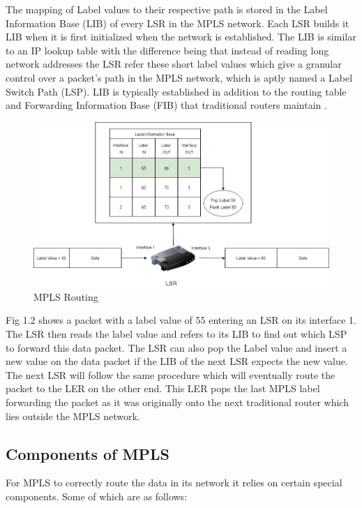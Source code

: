 The mapping of Label values to their respective path is stored in the Label Information Base (LIB) of every LSR in the MPLS network. Each LSR builds it LIB when it is first initialized when the network is established. The LIB is similar to an IP lookup table with the difference being that instead of reading long network addresses the LSR refer these short label values which give a granular control over a packet's path in the MPLS network, which is aptly named a Label Switch Path (LSP). LIB is typically established in addition to the routing table and Forwarding Information Base (FIB) that traditional routers maintain \cite{pise2005packet}.

\begin{figure}[H]
       \centering\includegraphics[width=\textwidth]{images/2_MPLSRouting.jpg}
       \caption{MPLS Routing}
       \label{fig:compbest}
\end{figure}

Fig 1.2 shows a packet with a label value of 55 entering an LSR on its interface 1. The LSR then reads the label value and refers to its LIB to find out which LSP to forward this data packet. The LSR can also pop the Label value and insert a new value on the data packet if the LIB of the next LSR expects the new value. The next LSR will follow the same procedure which will eventually route the packet to the LER on the other end. This LER pops the last MPLS label forwarding the packet as it was originally onto the next traditional router which lies outside the MPLS network.

\subsection{Components of MPLS}
For MPLS to correctly route the data in its network it relies on certain special components. Some of which are as follows:

